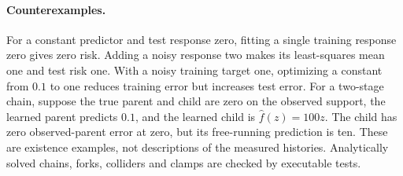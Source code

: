 \paragraph{Counterexamples.}
For a constant predictor and test response zero, fitting a single training
response zero gives zero risk. Adding a noisy response two makes its
least-squares mean one and test risk one. With a noisy training target one,
optimizing a constant from $0.1$ to one reduces training error but increases
test error. For a two-stage chain, suppose the true parent and child are zero
on the observed support, the learned parent predicts $0.1$, and the learned
child is $\hat f(z)=100z$. The child has zero observed-parent error at zero,
but its free-running prediction is ten. These are existence examples, not
descriptions of the measured histories. Analytically solved chains, forks,
colliders and clamps are checked by executable tests.


